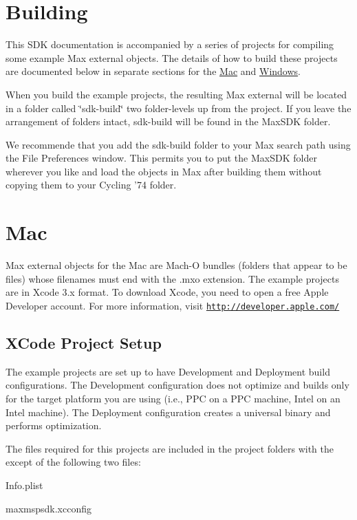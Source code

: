 \hypertarget{chapter_platform_chapter_platform_building}{}\section{Building}\label{chapter_platform_chapter_platform_building}
This SDK documentation is accompanied by a series of projects for compiling some example Max external objects. The details of how to build these projects are documented below in separate sections for the \hyperlink{chapter_platform_chapter_platform_mac}{Mac} and \hyperlink{chapter_platform_chapter_platform_win}{Windows}.

When you build the example projects, the resulting Max external will be located in a folder called \char`\"{}sdk-\/build\char`\"{} two folder-\/levels up from the project. If you leave the arrangement of folders intact, sdk-\/build will be found in the MaxSDK folder.

We recommende that you add the sdk-\/build folder to your Max search path using the File Preferences window. This permits you to put the MaxSDK folder wherever you like and load the objects in Max after building them without copying them to your Cycling '74 folder.\hypertarget{chapter_platform_chapter_platform_mac}{}\section{Mac}\label{chapter_platform_chapter_platform_mac}
Max external objects for the Mac are Mach-\/O bundles (folders that appear to be files) whose filenames must end with the .mxo extension. The example projects are in Xcode 3.x format. To download Xcode, you need to open a free Apple Developer account. For more information, visit \href{http://developer.apple.com/}{\tt http://developer.apple.com/}\hypertarget{chapter_platform_chapter_platform_mac_xcodeproj}{}\subsection{XCode Project Setup}\label{chapter_platform_chapter_platform_mac_xcodeproj}
The example projects are set up to have Development and Deployment build configurations. The Development configuration does not optimize and builds only for the target platform you are using (i.e., PPC on a PPC machine, Intel on an Intel machine). The Deployment configuration creates a universal binary and performs optimization.

The files required for this projects are included in the project folders with the except of the following two files:
\begin{DoxyItemize}
\item Info.plist
\item maxmspsdk.xcconfig
\end{DoxyItemize}

